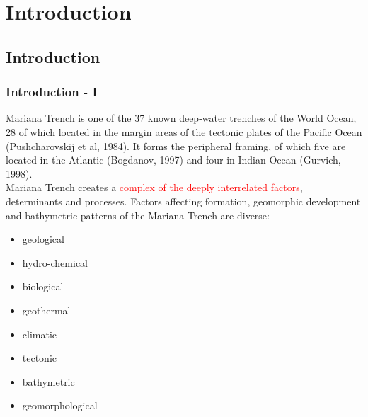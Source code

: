 \documentclass[pdflatex,compress,10pt,
	xcolor={dvipsnames,dvipsnames,svgnames,x11names,table},
	hyperref={colorlinks = true,breaklinks = true, urlcolor = NavyBlue, breaklinks = true}]{beamer}
\begin{document}
\section{Introduction}
\subsection{Introduction}

\begin{frame}\frametitle{Introduction - I}
Mariana Trench is one of the 37 known deep-water trenches of the World Ocean, 28 of which located in the margin areas of the tectonic plates of the Pacific Ocean (Pushcharovskij et al, 1984). It forms the peripheral framing, of which five are located in the Atlantic (Bogdanov, 1997) and four in Indian Ocean (Gurvich, 1998).\\ Mariana Trench creates a \textcolor{red}{complex of the deeply interrelated factors}, determinants and processes. Factors affecting formation, geomorphic development and bathymetric patterns of the Mariana Trench are diverse:\\
\begin{itemize}
            \item geological 
            \item hydro-chemical
            \item biological
            \item geothermal
            \item climatic
            \item tectonic
            \item bathymetric 
            \item geomorphological
  \end{itemize} 
\end{frame}
\end{document}
